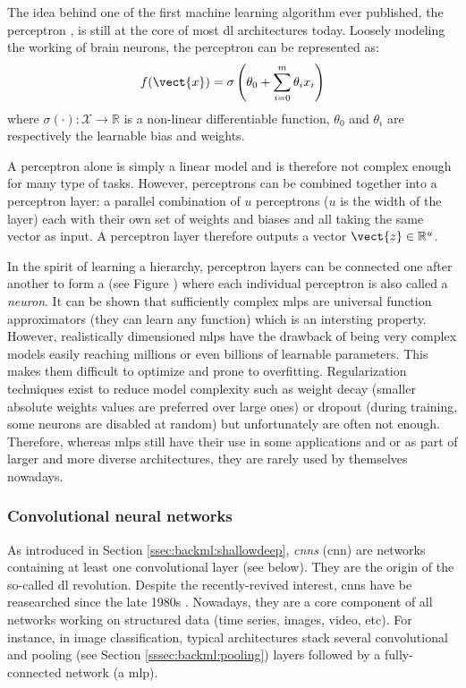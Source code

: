 The idea behind one of the first machine learning algorithm ever published, the perceptron \parencite{rosenblatt1958perceptron}, is still at the core of most \acrlong{dl} architectures today. Loosely modeling the working of brain neurons, the perceptron can be represented as: 
\begin{equation}
\label{eqn:backml:perceptron}
f(\vect{x}) = \sigma\left(\theta_0 + \sum_{i=0}^m \theta_i x_i\right)
\end{equation}
where $\sigma(\cdot): \mathcal{X} \rightarrow \mathbb{R}$ is a non-linear differentiable function, $\theta_0$ and $\theta_i$ are respectively the learnable bias and weights.

A perceptron alone is simply a linear model and is therefore not complex enough for many type of tasks. However, perceptrons can be combined together into a perceptron layer: a parallel combination of $u$ perceptrons ($u$ is the width of the layer) each with their own set of weights and biases and all taking the same vector as input. A perceptron layer therefore outputs a vector $\vect{z} \in \mathbb{R}^u$. 

In the spirit of learning a hierarchy, perceptron layers can be connected one after another to form a  (see Figure ) where each individual perceptron is also called a \textit{neuron}. It can be shown that sufficiently complex \acrshort{mlp}s are universal function approximators (\ie they can learn any function) \parencite{hornik1989multilayer} which is an intersting property. However, realistically dimensioned \acrshort{mlp}s have the drawback of being very complex models easily reaching millions or even billions of learnable parameters. This makes them difficult to optimize and prone to overfitting. Regularization techniques exist to reduce model complexity such as weight decay (\ie smaller absolute weights values are preferred over large ones) or dropout \parencite{srivastava2014dropout} (\eg during training, some neurons are disabled at random) but unfortunately are often not enough. Therefore, whereas \acrshort{mlp}s still have their use in some applications and or as part of larger and more diverse architectures, they are rarely used by themselves nowadays.

\subsubsection{Convolutional neural networks}
\label{sssec:backml:dl:cnn}

As introduced in Section \ref{ssec:backml:shallowdeep}, \textit{\acrlong{cnn}s} (\acrshort{cnn}) are networks containing at least one convolutional layer (see below). They are the origin of the so-called \acrlong{dl} revolution. Despite the recently-revived interest, \acrshort{cnn}s have be reasearched since the late 1980s \parencite{lecun1989handwritten}. Nowadays, they are a core component of all networks working on structured data (time series, images, video, etc). For instance, in image classification, typical architectures stack several convolutional and pooling (see Section \ref{sssec:backml:pooling}) layers followed by a fully-connected network (\ie a \acrshort{mlp}). 

